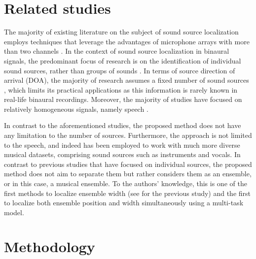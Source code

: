 \documentclass{article}
\begin{document}
\section{Related studies}
\label{sec:related-studies}

The majority of existing literature on the subject of sound source localization employs techniques that leverage the advantages of microphone arrays with more than two channels \cite{kaveh_statistical_1986, pavlidi_real-time_2012, pan_multi-tone_2021, hahmann_sound_2022, chung_sound_2022, liu_sound_2022}. In the context of sound source localization in binaural signals, the predominant focus of research is on the identification of individual sound sources, rather than groups of sounds \cite{dietz_auditory_2011, may_probabilistic_2011, may_binaural_2012, woodruff_binaural_2012, may_robust_2015, ma16c_interspeech, ma_exploiting_2017, benaroya_binaural_2018}. In terms of source direction of arrival (DOA), the majority of research assumes a fixed number of sound sources \cite{pang_multitask_2019, vecchiotti19, ma_exploiting_2017, woodruff_binaural_2012, s_spatiogram_2021}, which limits its practical applications as this information is rarely known in real-life binaural recordings. Moreover, the majority of studies have focused on relatively homogeneous signals, namely speech \cite{dietz_auditory_2011, may_probabilistic_2011, may_binaural_2012, woodruff_binaural_2012, may_robust_2015, ma16c_interspeech, ma_exploiting_2017, benaroya_binaural_2018, wang_binaural_2020, liu_multiple_2018, yang_deepear_2022, ma_robust_2018}. 

In contrast to the aforementioned studies, the proposed method does not have any limitation to the number of sources. Furthermore, the approach is not limited to the speech, and indeed has been employed to work with much more diverse musical datasets, comprising sound sources such as instruments and vocals. In contrast to previous studies that have focused on individual sources, the proposed method does not aim to separate them but rather considers them as an ensemble, or in this case, a musical ensemble. To the authors' knowledge, this is one of the first methods to localize ensemble width (see \cite{antoniuk2023blind} for the previous study) and the first to localize both ensemble position and width simultaneously using a multi-task model.

\section{Methodology}
\label{sec:methodology}
\end{document}
